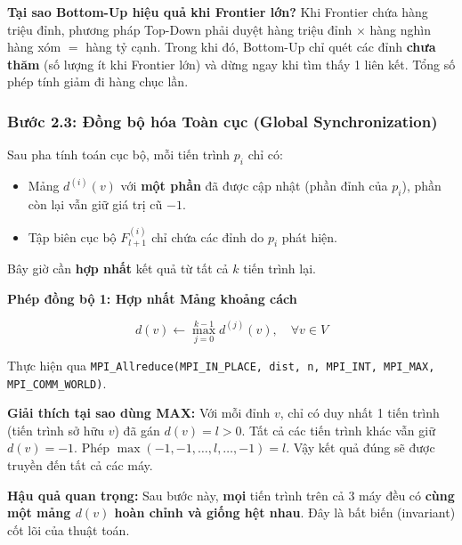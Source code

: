\documentclass[12pt,a4paper]{article}
\begin{document}
\begin{explain}
\textbf{Tại sao Bottom-Up hiệu quả khi Frontier lớn?} Khi Frontier chứa hàng triệu đỉnh, phương pháp Top-Down phải duyệt hàng triệu đỉnh $\times$ hàng nghìn hàng xóm $=$ hàng tỷ cạnh. Trong khi đó, Bottom-Up chỉ quét các đỉnh \textbf{chưa thăm} (số lượng ít khi Frontier lớn) và dừng ngay khi tìm thấy 1 liên kết. Tổng số phép tính giảm đi hàng chục lần.
\end{explain}

\subsubsection{Bước 2.3: Đồng bộ hóa Toàn cục (Global Synchronization)}

Sau pha tính toán cục bộ, mỗi tiến trình $p_i$ chỉ có:
\begin{itemize}
  \item Mảng $d^{(i)}(v)$ với \textbf{một phần} đã được cập nhật (phần đỉnh của $p_i$), phần còn lại vẫn giữ giá trị cũ $-1$.
  \item Tập biên cục bộ $F_{l+1}^{(i)}$ chỉ chứa các đỉnh do $p_i$ phát hiện.
\end{itemize}

Bây giờ cần \textbf{hợp nhất} kết quả từ tất cả $k$ tiến trình lại.

\textbf{Phép đồng bộ 1: Hợp nhất Mảng khoảng cách}

\begin{equation}
d(v) \leftarrow \max_{j=0}^{k-1} d^{(j)}(v), \quad \forall v \in V
\end{equation}

\begin{explain}
Thực hiện qua \texttt{MPI\_Allreduce(MPI\_IN\_PLACE, dist, n, MPI\_INT, MPI\_MAX, MPI\_COMM\_WORLD)}.

\textbf{Giải thích tại sao dùng MAX:} Với mỗi đỉnh $v$, chỉ có duy nhất 1 tiến trình (tiến trình sở hữu $v$) đã gán $d(v) = l > 0$. Tất cả các tiến trình khác vẫn giữ $d(v) = -1$. Phép $\max(-1, -1, \ldots, l, \ldots, -1) = l$. Vậy kết quả đúng sẽ được truyền đến tất cả các máy.

\textbf{Hậu quả quan trọng:} Sau bước này, \textbf{mọi} tiến trình trên cả 3 máy đều có \textbf{cùng một mảng $d(v)$ hoàn chỉnh và giống hệt nhau}. Đây là bất biến (invariant) cốt lõi của thuật toán.
\end{explain}
\end{document}
